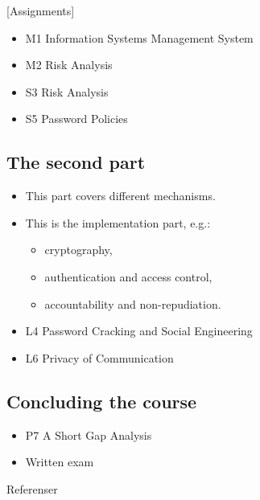 \documentclass{beamer}
\begin{document}
\begin{frame}{\insertsubsectionhead}[Assignments]
  \begin{itemize}
    \item M1 Information Systems Management System
    \item M2 Risk Analysis
    \item S3 Risk Analysis
    \item S5 Password Policies
  \end{itemize}
\end{frame}

\subsection{The second part}

\begin{frame}{\insertsubsectionhead}
  \begin{itemize}
    \item This part covers different mechanisms.
    \item This is the implementation part, e.g.:
      \begin{itemize}
        \item cryptography,
        \item authentication and access control,
        \item accountability and non-repudiation.
      \end{itemize}
  \end{itemize}
\end{frame}

\begin{frame}{\insertsubsectionhead}
  \begin{itemize}
    \item L4 Password Cracking and Social Engineering
    \item L6 Privacy of Communication
  \end{itemize}
\end{frame}

\subsection{Concluding the course}

\begin{frame}{\insertsubsectionhead}
  \begin{itemize}
    \item P7 A Short Gap Analysis
    \item Written exam
  \end{itemize}
\end{frame}



\begin{frame}[allowframebreaks]{Referenser}
  \small
  \printbibliography
\end{frame}
\end{document}
